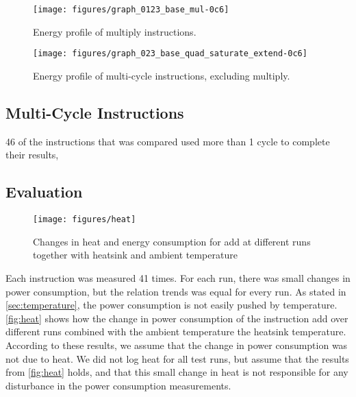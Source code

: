 \begin{figure*}
    \centering
    \texttt{[image: figures/graph\_0123\_base\_mul-0c6]}
    \caption{Energy profile of multiply instructions.}
    \label{fig:allmul}
\end{figure*}

\begin{figure}
    \centering
    \texttt{[image: figures/graph\_023\_base\_quad\_saturate\_extend-0c6]}
    \caption{Energy profile of multi-cycle instructions, excluding multiply.}
    \label{fig:multicycle}
\end{figure}


\subsection{Multi-Cycle Instructions}


46 of the instructions that was compared used more than 1 cycle to complete their results, 


\subsection{Evaluation}
\begin{figure}
    \centering
    \texttt{[image: figures/heat]}
    \caption{Changes in heat and energy consumption for {\ttfamily add} at different runs together with heatsink and ambient temperature}
    \label{fig:heat}
\end{figure}

Each instruction was measured 41 times. For each run, there was small changes in
power consumption, but the relation trends was equal for every run.
As stated in \autoref{sec:temperature}, the power consumption is not easily pushed by temperature. \autoref{fig:heat} shows how the change in power consumption of the instruction
{\ttfamily add} over different runs combined with the ambient temperature the
heatsink temperature. According to these results, we assume that the change in
power consumption was not due to heat. We did not log heat for all test runs,
but assume that the results from \autoref{fig:heat} holds, and that this small
change in heat is not responsible for any disturbance in the power consumption
measurements.


